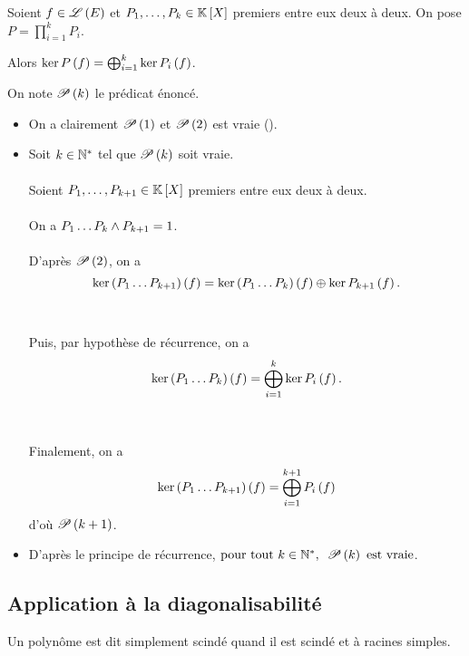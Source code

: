\begin{prop}
Soient \(f\in\Lendo{E}\) et \(P_1,\dots,P_k\in\poly\) premiers entre eux deux à deux. On pose \(P=\prod_{i=1}^kP_i\).

Alors \(\ker P\paren{f}=\bigoplus_{i=1}^k\ker P_i\paren{f}\).
\end{prop}

\begin{dem}
On note \(\P{k}\) le prédicat énoncé.

\begin{itemize}
    \item On a clairement \(\P{1}\) et \(\P{2}\) est vraie (\cf {}). \\
    \item Soit \(k\in\Ns\) tel que \(\P{k}\) soit vraie. \\\\ Soient \(P_1,\dots,P_{k+1}\in\poly\) premiers entre eux deux à deux. \\\\ On a \(P_1\dots P_k\et P_{k+1}=1\). \\\\ D'après \(\P{2}\), on a \[\ker\paren{P_1\dots P_{k+1}}\paren{f}=\ker\paren{P_1\dots P_k}\paren{f}\oplus\ker P_{k+1}\paren{f}.\] \\\\ Puis, par hypothèse de récurrence, on a \[\ker\paren{P_1\dots P_k}\paren{f}=\bigoplus_{i=1}^k\ker P_i\paren{f}.\] \\\\ Finalement, on a \[\ker\paren{P_1\dots P_{k+1}}\paren{f}=\bigoplus_{i=1}^{k+1}P_i\paren{f}\] d'où \(\P{k+1}\). \\
    \item D'après le principe de récurrence, \(\quantifs{\tpt k\in\Ns}\P{k}\text{ est vraie}\).
\end{itemize}
\end{dem}

\subsection{Application à la diagonalisabilité}

\begin{defi}
Un polynôme est dit simplement scindé quand il est scindé et à racines simples.
\end{defi}

